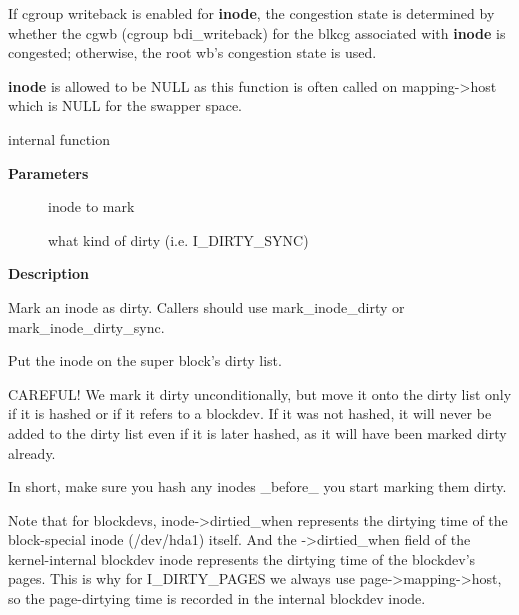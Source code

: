 \documentclass[a4paper,8pt,english]{sphinxmanual}
\begin{document}
If cgroup writeback is enabled for \textbf{inode}, the congestion state is
determined by whether the cgwb (cgroup bdi\_writeback) for the blkcg
associated with \textbf{inode} is congested; otherwise, the root wb's congestion
state is used.

\textbf{inode} is allowed to be NULL as this function is often called on
mapping-\textgreater{}host which is NULL for the swapper space.

\begin{fulllineitems}
\label{filesystems/index:c.__mark_inode_dirty}
internal function

\end{fulllineitems}


\textbf{Parameters}
\begin{description}
\item[{}] \leavevmode
inode to mark

\item[{}] \leavevmode
what kind of dirty (i.e. I\_DIRTY\_SYNC)

\end{description}

\textbf{Description}

Mark an inode as dirty. Callers should use mark\_inode\_dirty or
mark\_inode\_dirty\_sync.

Put the inode on the super block's dirty list.

CAREFUL! We mark it dirty unconditionally, but move it onto the
dirty list only if it is hashed or if it refers to a blockdev.
If it was not hashed, it will never be added to the dirty list
even if it is later hashed, as it will have been marked dirty already.

In short, make sure you hash any inodes \_before\_ you start marking
them dirty.

Note that for blockdevs, inode-\textgreater{}dirtied\_when represents the dirtying time of
the block-special inode (/dev/hda1) itself.  And the -\textgreater{}dirtied\_when field of
the kernel-internal blockdev inode represents the dirtying time of the
blockdev's pages.  This is why for I\_DIRTY\_PAGES we always use
page-\textgreater{}mapping-\textgreater{}host, so the page-dirtying time is recorded in the internal
blockdev inode.
\end{document}
